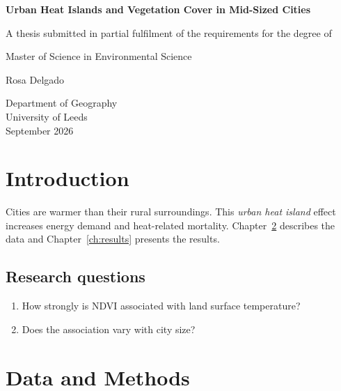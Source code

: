 \documentclass[12pt,a4paper,oneside]{report}
\begin{document}
\begin{titlepage}
  \centering
  \vspace*{2cm}
  {\LARGE\bfseries Urban Heat Islands and Vegetation Cover in Mid-Sized Cities\par}
  \vspace{2cm}
  {\large A thesis submitted in partial fulfilment of the requirements for the degree of\par}
  {\large Master of Science in Environmental Science\par}
  \vspace{2cm}
  {\Large Rosa Delgado\par}
  \vfill
  {\large Department of Geography\\University of Leeds\\September 2026\par}
\end{titlepage}

\begin{abstract}
This thesis examines the relationship between vegetation cover, measured by the
normalised difference vegetation index (NDVI), and land surface temperature in twelve
European cities of between 200\,000 and 800\,000 inhabitants.
\end{abstract}

\tableofcontents
\listoffigures
\listoftables

\chapter{Introduction}
\label{ch:intro}
Cities are warmer than their rural surroundings. This \emph{urban heat island} effect
increases energy demand and heat-related mortality. Chapter~\ref{ch:data} describes the
data and Chapter~\ref{ch:results} presents the results.

\section{Research questions}
\begin{enumerate}
  \item How strongly is NDVI associated with land surface temperature?
  \item Does the association vary with city size?
\end{enumerate}

\chapter{Data and Methods}
\label{ch:data}
\end{document}
